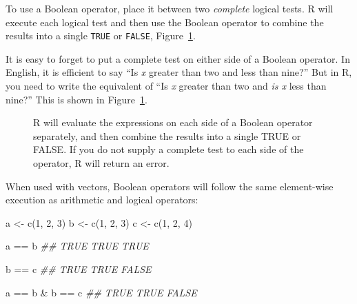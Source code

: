 \documentclass[
  letterpaper,
  DIV=11,
  numbers=noendperiod]{scrbook}
\makeatletter
\newenvironment{Shaded}{\begin{snugshade}}{\end{snugshade}}
\newcommand{\DecValTok}[1]{\textcolor[rgb]{0.68,0.00,0.00}{#1}}
\newcommand{\DocumentationTok}[1]{\textcolor[rgb]{0.37,0.37,0.37}{\textit{#1}}}
\newcommand{\FunctionTok}[1]{\textcolor[rgb]{0.28,0.35,0.67}{#1}}
\newcommand{\NormalTok}[1]{\textcolor[rgb]{0.00,0.23,0.31}{#1}}
\newcommand{\OtherTok}[1]{\textcolor[rgb]{0.00,0.23,0.31}{#1}}
\newcommand{\SpecialCharTok}[1]{\textcolor[rgb]{0.37,0.37,0.37}{#1}}
\newcommand*\pandocbounded[1]{%
  \sbox\pandoc@box{#1}%
  \Gscale@div\@tempa{\textheight}{\dimexpr\ht\pandoc@box+\dp\pandoc@box\relax}%
  \Gscale@div\@tempb{\linewidth}{\wd\pandoc@box}%
  \ifdim\@tempb\p@<\@tempa\p@\let\@tempa\@tempb\fi%
  \ifdim\@tempa\p@<\p@\scalebox{\@tempa}{\usebox\pandoc@box}%
  \else\usebox{\pandoc@box}%
  \fi%
}
\makeatother
\begin{document}
To use a Boolean operator, place it between two \emph{complete} logical
tests. R will execute each logical test and then use the Boolean
operator to combine the results into a single \texttt{TRUE} or
\texttt{FALSE}, Figure~\ref{fig-boolean}.

\begin{tcolorbox}[enhanced jigsaw, breakable, colback=white, colbacktitle=quarto-callout-warning-color!10!white, arc=.35mm, bottomrule=.15mm, coltitle=black, left=2mm, rightrule=.15mm, colframe=quarto-callout-warning-color-frame, leftrule=.75mm, opacitybacktitle=0.6, bottomtitle=1mm, toptitle=1mm, titlerule=0mm, opacityback=0, title=\textcolor{quarto-callout-warning-color}{\faExclamationTriangle}\hspace{0.5em}{The most common mistake with Boolean operators}, toprule=.15mm]

It is easy to forget to put a complete test on either side of a Boolean
operator. In English, it is efficient to say ``Is \emph{x} greater than
two and less than nine?'' But in R, you need to write the equivalent of
``Is \emph{x} greater than two and \emph{is x} less than nine?'' This is
shown in Figure~\ref{fig-boolean}.

\end{tcolorbox}

\begin{figure}

\centering{

\pandocbounded{\texttt{[image: images/hopr\_0501.png]}}

}

\caption{\label{fig-boolean}R will evaluate the expressions on each side
of a Boolean operator separately, and then combine the results into a
single TRUE or FALSE. If you do not supply a complete test to each side
of the operator, R will return an error.}

\end{figure}%

When used with vectors, Boolean operators will follow the same
element-wise execution as arithmetic and logical operators:

\begin{Shaded}
\begin{Highlighting}[]
\NormalTok{a }\OtherTok{\textless{}{-}} \FunctionTok{c}\NormalTok{(}\DecValTok{1}\NormalTok{, }\DecValTok{2}\NormalTok{, }\DecValTok{3}\NormalTok{)}
\NormalTok{b }\OtherTok{\textless{}{-}} \FunctionTok{c}\NormalTok{(}\DecValTok{1}\NormalTok{, }\DecValTok{2}\NormalTok{, }\DecValTok{3}\NormalTok{)}
\NormalTok{c }\OtherTok{\textless{}{-}} \FunctionTok{c}\NormalTok{(}\DecValTok{1}\NormalTok{, }\DecValTok{2}\NormalTok{, }\DecValTok{4}\NormalTok{)}

\NormalTok{a }\SpecialCharTok{==}\NormalTok{ b}
\DocumentationTok{\#\#  TRUE TRUE TRUE}

\NormalTok{b }\SpecialCharTok{==}\NormalTok{ c}
\DocumentationTok{\#\#  TRUE  TRUE FALSE}

\NormalTok{a }\SpecialCharTok{==}\NormalTok{ b }\SpecialCharTok{\&}\NormalTok{ b }\SpecialCharTok{==}\NormalTok{ c}
\DocumentationTok{\#\#  TRUE  TRUE FALSE}
\end{Highlighting}
\end{Shaded}
\end{document}
